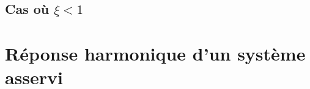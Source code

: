 \documentclass[10pt,oneside]{article}
\begin{document}
\subsection{Cas où $\xi<1$}
\section{Réponse harmonique d'un système asservi}

\begin{thebibliography}{2}

\end{thebibliography}
\end{document}
